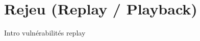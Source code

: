 

\newpage
\section{Rejeu (Replay / Playback)}\label{vulnerabilites:reseau:replay}

Intro vulnérabilités replay

\endinput
